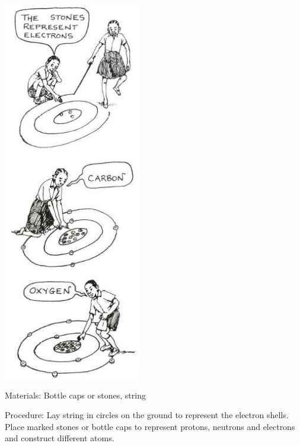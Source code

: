 \begin{multicols}{2}
\begin{center}
\includegraphics[width=0.45\textwidth]{./img/source/stone-atoms.jpg}
\end{center}

\begin{description*}
\item[Materials:]{Bottle caps or stones, string}
\item[Procedure:]{Lay string in circles on the ground to represent the electron shells. Place marked stones or bottle caps to represent protons, neutrons and electrons and construct different atoms.}
\end{description*}


\end{multicols}
